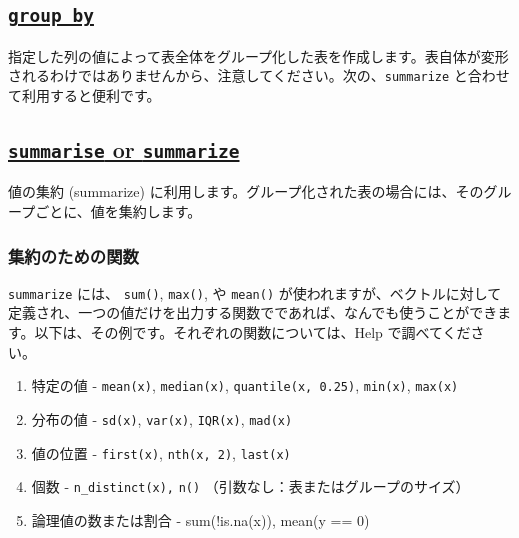 \documentclass[
  xelatex, ja=standard]{bxjsbook}
\theoremstyle{definition}
\theoremstyle{definition}
\theoremstyle{definition}
\theoremstyle{definition}
\theoremstyle{remark}
\begin{document}
\hypertarget{group_by}{%
\subsection{\texorpdfstring{\href{https://dplyr.tidyverse.org/reference/group_by.html}{\texttt{group\_by}}}{group\_by}}\label{group_by}}

指定した列の値によって表全体をグループ化した表を作成します。表自体が変形されるわけではありませんから、注意してください。次の、\texttt{summarize} と合わせて利用すると便利です。

\hypertarget{summarise-or-summarize}{%
\subsection{\texorpdfstring{\href{https://dplyr.tidyverse.org/reference/summarise.html}{\texttt{summarise} or \texttt{summarize}}}{summarise or summarize}}\label{summarise-or-summarize}}

値の集約 (summarize) に利用します。グループ化された表の場合には、そのグループごとに、値を集約します。

\hypertarget{ux96c6ux7d04ux306eux305fux3081ux306eux95a2ux6570}{%
\subsubsection{集約のための関数}\label{ux96c6ux7d04ux306eux305fux3081ux306eux95a2ux6570}}

\texttt{summarize} には、 \texttt{sum()}, \texttt{max()}, や \texttt{mean()} が使われますが、ベクトルに対して定義され、一つの値だけを出力する関数でであれば、なんでも使うことができます。以下は、その例です。それぞれの関数については、Help で調べてください。

\begin{enumerate}
\def\labelenumi{\arabic{enumi}.}
\item
  特定の値 - \texttt{mean(x)}, \texttt{median(x)}, \texttt{quantile(x,\ 0.25)}, \texttt{min(x)}, \texttt{max(x)}
\item
  分布の値 - \texttt{sd(x)}, \texttt{var(x)}, \texttt{IQR(x)}, \texttt{mad(x)}
\item
  値の位置 - \texttt{first(x)}, \texttt{nth(x,\ 2)}, \texttt{last(x)}
\item
  個数 - \texttt{n\_distinct(x),} \texttt{n()} （引数なし：表またはグループのサイズ）
\item
  論理値の数または割合 - sum(!is.na(x)), mean(y == 0)
\end{enumerate}
\end{document}
